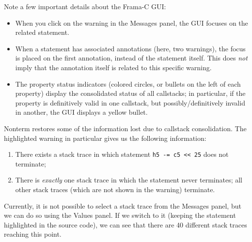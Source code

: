 Note a few important details about the Frama-C GUI:

\begin{itemize}

\item
  When you click on the warning in the Messages panel, the GUI focuses
  on the related statement.
\item
  When a statement has associated annotations (here, two warnings), the
  focus is placed on the first annotation, instead of the statement
  itself. This does \emph{not} imply that the annotation itself is
  related to this specific warning.
\item
  The property status indicators (colored circles, or bullets on the
  left of each property) display the consolidated status of all
  callstacks; in particular, if the property is definitively valid in
  one callstack, but possibly/definitively invalid in another, the GUI
  displays a yellow bullet.
\end{itemize}

Nonterm restores some of the information lost due to callstack
consolidation. The highlighted warning in particular gives us the
following information:

\begin{enumerate}
\def\labelenumi{\arabic{enumi}.}

\item
  There exists a stack trace in which statement
  \texttt{h5\ -=\ c5\ \textless{}\textless{}\ 25} does not terminate;
\item
  There is \emph{exactly} one stack trace in which the statement never
  terminates; all other stack traces (which are not shown in the
  warning) terminate.
\end{enumerate}

Currently, it is not possible to select a stack trace from the Messages
panel, but we can do so using the Values panel. If we switch to it
(keeping the statement highlighted in the source code), we can see that
there are 40 different stack traces reaching this point.
